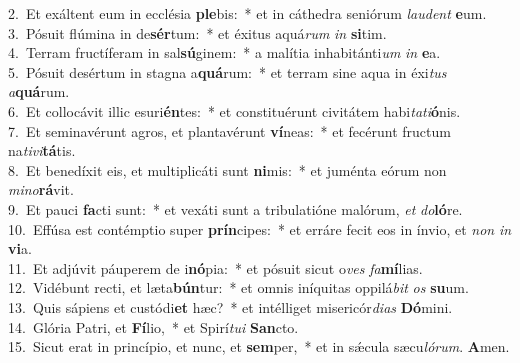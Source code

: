{2.~}Et exáltent eum in ecclésia \textbf{ple}bis:~* et in cáthedra seniórum \textit{lau}\textit{dent} \textbf{e}um.\\
{3.~}Pósuit flúmina in de\textbf{sér}tum:~* et éxitus aquá\textit{rum} \textit{in} \textbf{si}tim.\\
{4.~}Terram fructíferam in sal\textbf{sú}ginem:~* a malítia inhabitánti\textit{um} \textit{in} \textbf{e}a.\\
{5.~}Pósuit desértum in stagna a\textbf{quá}rum:~* et terram sine aqua in éxi\textit{tus} \textit{a}\textbf{quá}rum.\\
{6.~}Et collocávit illic esuri\textbf{én}tes:~* et constituérunt civitátem habi\textit{ta}\textit{ti}\textbf{ó}nis.\\
{7.~}Et seminavérunt agros, et plantavérunt \textbf{ví}neas:~* et fecérunt fructum na\textit{ti}\textit{vi}\textbf{tá}tis.\\
{8.~}Et benedíxit eis, et multiplicáti sunt \textbf{ni}mis:~* et juménta eórum non \textit{mi}\textit{no}\textbf{rá}vit.\\
{9.~}Et pauci \textbf{fa}cti sunt:~* et vexáti sunt a tribulatióne malórum, \textit{et} \textit{do}\textbf{ló}re.\\
{10.~}Effúsa est contémptio super \textbf{prín}cipes:~* et erráre fecit eos in ínvio, et \textit{non} \textit{in} \textbf{vi}a.\\
{11.~}Et adjúvit páuperem de i\textbf{nó}pia:~* et pósuit sicut o\textit{ves} \textit{fa}\textbf{mí}lias.\\
{12.~}Vidébunt recti, et læta\textbf{bún}tur:~* et omnis iníquitas oppilá\textit{bit} \textit{os} \textbf{su}um.\\
{13.~}Quis sápiens et custódi\textbf{et} hæc?~* et intélliget misericór\textit{di}\textit{as} \textbf{Dó}mini.\\
{14.~}Glória Patri, et \textbf{Fí}lio,~* et Spirí\textit{tu}\textit{i} \textbf{San}cto.\\
{15.~}Sicut erat in princípio, et nunc, et \textbf{sem}per,~* et in sǽcula sæcu\textit{ló}\textit{rum}. \textbf{A}men.\\
